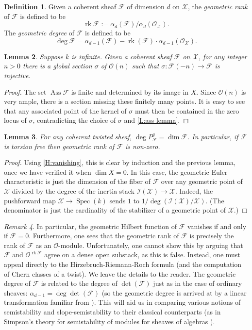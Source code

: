 \documentclass[11pt]{amsart}
\newcommand{\ms}[1]{\mathscr #1}
\newcommand{\spec}{\operatorname{Spec}}
\renewcommand{\[}{[\!\hspace{0.03em}[}
\renewcommand{\]}{]\!\hspace{0.03em}]}
\renewcommand{\(}{(\!\hspace{0.03em}(}
\renewcommand{\)}{)\!\hspace{0.03em})}
\DeclareMathOperator{\rk}{\operatorname{rk}}
\newtheorem{lem}{Lemma}[subsubsection]%
\theoremstyle{definition}
\newtheorem{defn}[lem]{Definition}
\theoremstyle{remark}
\newtheorem{remark}[lem]{Remark}
\begin{document}
\begin{defn} Given a coherent sheaf $\ms F$ of 
dimension $d$ on $\ms X$, the 
\emph{geometric rank\/} of $\ms F$ is defined to be $$\rk\ms F:=\alpha_{d}(\ms 
F)/\alpha_{d}({\ms O}_{\ms X}).$$  The \emph{geometric degree\/} of $\ms F$ is defined to be 
$$\deg\ms F=\alpha_{d-1}(\ms F)-\rk(\ms F)\cdot\alpha_{d-1}({\ms O}_{\ms X}).$$
\end{defn}
\begin{lem} Suppose $k$ is infinite.  Given a coherent sheaf $\ms F$ on $\ms X$, for any integer $n>0$ there is a 
global section $\sigma$ of ${\ms O}(n)$ such that $\sigma:\ms F(-n)\to\ms F$ 
is injective.
\end{lem}
\begin{proof} The set $\operatorname{Ass}\ms F$ is finite and 
determined by its image in $X$.  Since ${\ms O}(n)$ is very ample, 
there is a 
section missing these finitely many points.  It is easy to see that 
any associated point of the kernel of $\sigma$ must then be contained 
in the zero locus of $\sigma$, contradicting the choice of $\sigma$ 
and \ref{L:ass lemma}. 
\end{proof}

\begin{lem} For any coherent twisted sheaf, $\deg P^{g}_{\ms F}=\dim\ms 
F$.  In particular, if $\ms F$ is torsion free then geometric rank of $\ms F$ is non-zero.
\end{lem}
\begin{proof}  
Using \ref{H:vanishing}, this is clear by induction and the previous lemma, once we have 
verified it when $\dim X=0$.  In this case, the geometric Euler 
characteristic is just the dimension of the fiber of $\ms F$ over any 
geometric point of $\ms X$ divided by the degree of the inertia stack $\ms I(\ms X)\to\ms X$.  Indeed, the pushforward map $\ms X\to\spec(k)$ sends $1$ to $1/\deg(\ms I(\ms X)/\ms X)$.  (The denominator is just the cardinality of the stabilizer of a geometric point of $\ms X$.)  
\end{proof}

\begin{remark}\label{R:vanish if P does} In particular, the geometric Hilbert function of $\ms F$ vanishes if 
and only if $\ms F=0$.  Furthermore, one sees that the geometric rank 
of $\ms F$ is precisely the rank of $\ms F$ as an ${\ms O}$-module.  
Unfortunately, one cannot show this by arguing that $\ms F$ and 
${\ms O}^{\rk\ms F}$ agree on a dense open substack, as this is false.  
Instead, one must appeal directly to the Hirzebruch-Riemann-Roch 
formula (and the computation \cite[3.2.2]{fulton} of Chern classes of a twist). 
We leave the details to the 
reader.  The geometric degree of $\ms F$ is related to the degree of 
$\det(\ms F)$ just as in the case of ordinary sheaves: 
$\alpha_{d-1}=\deg\det(\ms F)$ (so the geometric degree is arrived at 
by a linear transformation familiar from \cite[1.6.8ff]{h-l}).  This will aid us in 
comparing various notions of semistability and slope-semistability to 
their classical counterparts (as in Simpson's theory for 
semistability of modules for sheaves of algebras \cite[\S3]{simpson}).
\end{remark}
\end{document}
